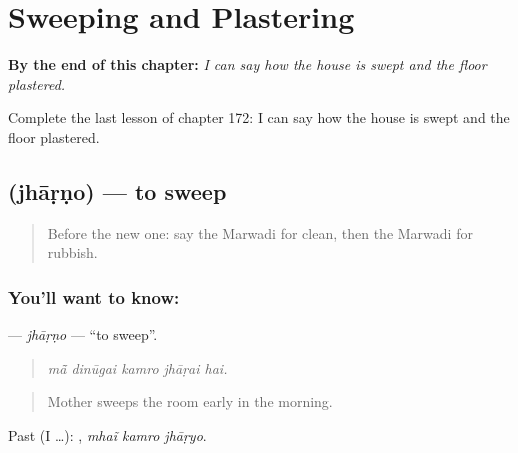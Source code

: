 
\chapter{Sweeping and Plastering}
\label{ch:mw-sweeping-and-plastering}

\begin{chapteropening}
\textbf{By the end of this chapter:} \emph{I can say how the house is swept and the floor plastered.}

Complete the last lesson of chapter 172: I can say how the house is swept and the floor plastered.
\end{chapteropening}

\section[\texorpdfstring{\mw{झाड़णो} (jhāṛṇo)}{झाड़णो (jhāṛṇo)}]{ (jhāṛṇo) — to sweep}

\label{lesson:MW-C172-jharno}



\begin{quote}
Before the new one: say the Marwadi for clean, then the Marwadi for rubbish.
\end{quote}

\subsection*{You'll want to know: }
\textbf{} — \emph{jhāṛṇo} — \textquotedblleft{}to sweep\textquotedblright{}.

\begin{quote}
    
\end{quote}

\begin{quote}
\emph{mā̃ dinūgai kamro jhāṛai hai.}
\end{quote}

\begin{quote}
Mother sweeps the room early in the morning.
\end{quote}

Past (I …):   , \emph{mhaĩ kamro jhāṛyo}.

